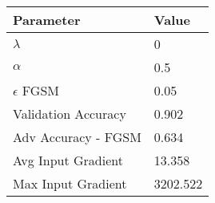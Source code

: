 \documentclass[draft,final]{vutinfth} %
\begin{document}
\begin{table}[h]
  \centering
  \begin{tabular}{ll}
    \toprule
			Parameter			& Value   \\
    \midrule
			$\lambda$								& 0				\\
			$\alpha$								& 0.5				\\
			$\epsilon$ FGSM					& 0.05		\\
			
			Validation Accuracy			& 0.902		\\ 
			Adv Accuracy - FGSM			& 0.634		\\
			
			Avg Input Gradient			& 13.358	\\
			Max Input Gradient			& 3202.522\\
    \bottomrule
  \end{tabular}
\end{table}
\end{document}
